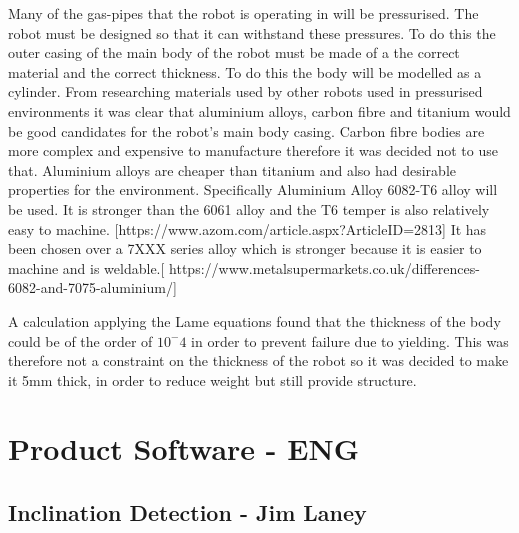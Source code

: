 \documentclass[11pt]{article}		%
\begin{document}
			Many of the gas-pipes that the robot is operating in will be pressurised. The robot must be designed so that it can withstand these pressures. To do this the outer casing of the main body of the robot must be made of a the correct material and the correct thickness. To do this the body will be modelled as a cylinder.
		    From researching materials used by other robots used in pressurised environments it was clear that aluminium alloys, carbon fibre and titanium would be good candidates for the robot’s main body casing. Carbon fibre bodies are more complex and expensive to manufacture therefore it was decided not to use that. Aluminium alloys are cheaper than titanium and also had desirable properties for the environment.
		    Specifically Aluminium Alloy 6082-T6 alloy will be used. It is stronger than the 6061 alloy and the T6 temper is also relatively easy to machine. [https://www.azom.com/article.aspx?ArticleID=2813]  It has been chosen over a 7XXX series alloy which is stronger because it is easier to machine and is weldable.[  https://www.metalsupermarkets.co.uk/differences-6082-and-7075-aluminium/] 
		    
		    A calculation applying the Lame equations found that the thickness of the body could be of the order of $10^-4$ in order to prevent failure due to yielding. This was therefore not a constraint on the thickness of the robot so it was decided to make it 5mm thick, in order to reduce weight but still provide structure.
	
	\section{Product Software - ENG}
		
		\subsection[Inclination Detection]{Inclination Detection - Jim Laney}
		
\end{document}
